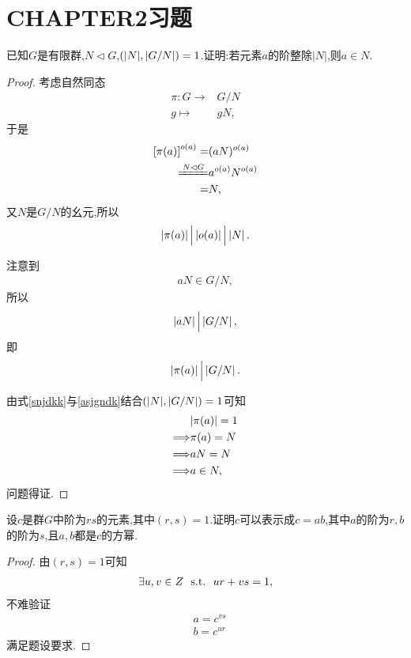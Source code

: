 \section{CHAPTER2习题}
\begin{problem}[P97T1]
    已知$G$是有限群,$N\lhd G$,$\left(|N|,|G/N|\right)=1$.证明:若元素$a$的阶整除$|N|$,则$a\in N$.
\end{problem}
\begin{proof}
    考虑自然同态\begin{align*}
        \pi:G\to&G/N\\
        g\mapsto&gN,
    \end{align*}于是\begin{align*}
        \l[\pi(a)\r]^{o(a)}=&(aN)^{o(a)}\\
        \xlongequal[]{N\lhd G}&a^{o(a)}N^{o(a)}\\
        =&N,
    \end{align*}又$N$是$G/N$的幺元,所以\begin{align}\label{snjdkk}
        \left|\pi(a)\right|\Big|\left|o(a)\right|\Big|\left|N\right|.
    \end{align}

    注意到\begin{align*}
        aN\in G/N,
    \end{align*}所以\begin{align*}
        \left|aN\right|\Big|\left|G/N\right|,
    \end{align*}即\begin{align}\label{asjgndk}
        \left|\pi(a)\right|\Big|\left|G/N\right|.
    \end{align}

    由式\eqref{snjdkk}与\eqref{asjgndk}结合$\left(|N|,|G/N|\right)=1$可知\begin{align*}
        &|\pi(a)|=1\\
        \Longrightarrow&\pi(a)=N\\
        \Longrightarrow&aN=N\\
        \Longrightarrow&a\in N,
    \end{align*}问题得证.
\end{proof}
\begin{problem}[P97T2]
    设$c$是群$G$中阶为$rs$的元素,其中$(r,s)=1$.证明$c$可以表示成$c=ab$,其中$a$的阶为$r,b$的阶为$s$,且$a,b$都是$c$的方幂.
\end{problem}
\begin{proof}
    由$(r,s)=1$可知\begin{align*}
        \exists u,v\in\relax{Z}\ \ \mathrm{s.t.}\ \  ur+vs=1,
    \end{align*}不难验证\begin{align*}
        &a=c^{vs}\\
        &b=c^{ur}
    \end{align*}满足题设要求.
\end{proof}
